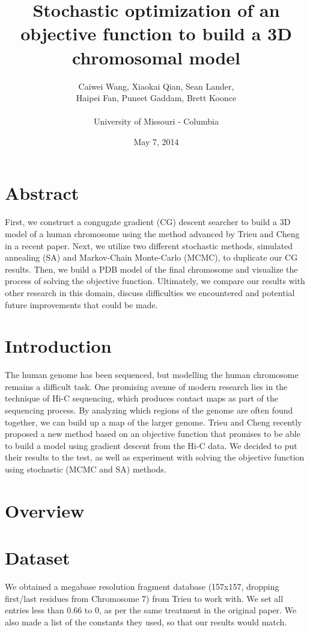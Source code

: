 \documentclass{article}
\title{Stochastic optimization of an objective function to build a 3D chromosomal model}
\author{Caiwei Wang, Xiaokai Qian, Sean Lander, \\Haipei Fan, Puneet Gaddam, Brett Koonce\\\\University of Missouri - Columbia}
\date{May 7, 2014}
\begin{document}
\maketitle

\section{Abstract}

First, we construct a congugate gradient (CG) descent searcher to build a 3D model of a human chromosome using the method advanced by Trieu and Cheng in a recent paper.  Next, we utilize two different stochastic methods, simulated annealing (SA) and Markov-Chain Monte-Carlo (MCMC), to duplicate our CG results.  Then, we build a PDB model of the final chromosome and visualize the process of solving the objective function.  Ultimately, we compare our results with other research in this domain, discuss difficulties we encountered and potential future improvements that could be made.

\section{Introduction}

The human genome has been sequenced, but modelling the human chromosome remains a difficult task.  One promising avenue of modern research lies in the technique of Hi-C sequencing, which produces contact maps as part of the sequencing process.  By analyzing which regions of the genome are often found together, we can build up a map of the larger genome.  Trieu and Cheng recently proposed a new method based on an objective function that promises to be able to build a model using gradient descent from the Hi-C data.  We decided to put their results to the test, as well as experiment with solving the objective function using stochastic (MCMC and SA) methods.

\section{Overview}



\section{Dataset}

We obtained a megabase resolution fragment database (157x157, dropping first/last residues from Chromosome 7) from Trieu to work with.  We set all entries less than 0.66 to 0, as per the same treatment in the original paper.  We also made a list of the constants they used, so that our results would match.
\end{document}

